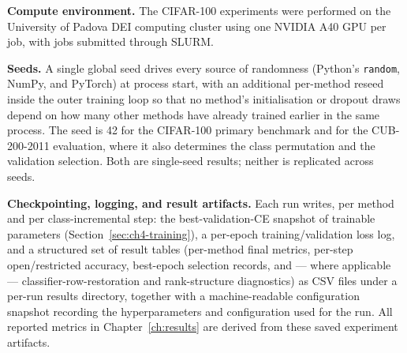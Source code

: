 \textbf{Compute environment.} The CIFAR-100 experiments were performed on
the University of Padova DEI computing cluster using one NVIDIA A40 GPU per job, with jobs
submitted through SLURM.

\textbf{Seeds.} A single global seed drives every source of randomness
(Python's \texttt{random}, NumPy, and PyTorch) at process start, with an
additional per-method reseed inside the outer training loop so that no
method's initialisation or dropout draws depend on how many other methods
have already trained earlier in the same process. The seed is 42 for the
CIFAR-100 primary benchmark and for the CUB-200-2011 evaluation, where it
also determines the class permutation and the validation selection. Both
are single-seed results; neither is replicated across seeds.

\textbf{Checkpointing, logging, and result artifacts.} Each run writes, per
method and per class-incremental step: the best-validation-CE snapshot of
trainable parameters (Section~\ref{sec:ch4-training}), a per-epoch
training/validation loss log, and a structured set of result tables
(per-method final metrics, per-step open/restricted accuracy, best-epoch
selection records, and --- where applicable --- classifier-row-restoration
and rank-structure diagnostics) as CSV files under a per-run results
directory, together with a machine-readable configuration snapshot
recording the hyperparameters and configuration used for the run. All reported metrics
in Chapter~\ref{ch:results} are derived from these saved experiment
artifacts.
